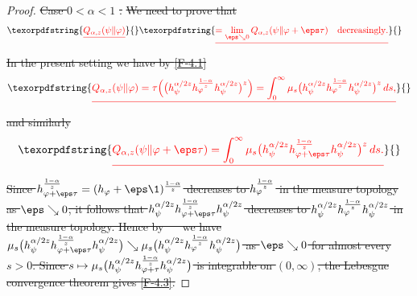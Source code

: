 \documentclass[12pt]{article}
\theoremstyle{definition}
\theoremstyle{remark}
\def\ffi{\varphi}
\providecommand{\DIFdeltex}[1]{{\protect\color{red}\sout{#1}}}                      %
\providecommand{\DIFdelbegin}{} %
\providecommand{\DIFdel}[1]{\texorpdfstring{\DIFdeltex{#1}}{}} %
\begin{document}
\begin{proof} \DIFdelbegin %
\DIFdel{Case $0<\alpha<1$}%
\DIFdel{.}%
\DIFdel{We need to prove that
}\begin{align*}\DIFdel{%
Q_{\alpha,z}(\psi\|\ffi)}&\DIFdel{=\lim_{\eps\searrow0}Q_{\alpha,z}(\psi\|\ffi+\eps\tau)\quad\mbox{decreasingly}.
}\end{align*}%
\DIFdel{In the present setting we have by \eqref{F-4.1}
}\begin{align*}\DIFdel{%
Q_{\alpha,z}(\psi\|\ffi)
=\tau\Bigl(\bigl(h_\psi^{\alpha/2z}h_\ffi^{1-\alpha\over z}h_\psi^{\alpha/2z}\bigr)^z\Bigr)
=\int_0^\infty\mu_s\bigl(h_\psi^{\alpha/2z}h_\ffi^{1-\alpha\over z}h_\psi^{\alpha/2z}\bigr)^z\,ds,
}\end{align*}%
\DIFdel{and similarly
}\[
\DIFdel{Q_{\alpha,z}(\psi\|\ffi+\eps\tau)
=\int_0^\infty\mu_s\bigl(h_\psi^{\alpha/2z}h_{\ffi+\eps\tau}^{1-\alpha\over z}h_\psi^{\alpha/2z}\bigr)^z\,ds.
}\]%
\DIFdel{Since $h_{\ffi+\eps\tau}^{1-\alpha\over z}=(h_\ffi+\eps\1)^{1-\alpha\over z}$ decreases to
$h_\ffi^{1-\alpha\over z}$ in the measure topology as $\eps\searrow0$, 
it follows that
$h_\psi^{\alpha/2z}h_{\ffi+\eps\tau}^{1-\alpha\over z}h_\psi^{\alpha/2z}$ decreases to
$h_\psi^{\alpha/2z}h_\ffi^{1-\alpha\over z}h_\psi^{\alpha/2z}$ in the measure topology. Hence by
\mbox{%
\cite[Lemma 3.4]{fack1986generalized} }\hskip0pt%
we have
$\mu_s\bigl(h_\psi^{\alpha/2z}h_{\ffi+\eps\tau}^{1-\alpha\over z}h_\psi^{\alpha/2z}\bigr)
\searrow\mu_s\bigl(h_\psi^{\alpha/2z}h_\ffi^{1-\alpha\over z}h_\psi^{\alpha/2z}\bigr)$
as $\eps\searrow0$ for almost every $s>0$. Since
$s\mapsto\mu_s\bigl(h_\psi^{\alpha/2z}h_{\ffi+\tau}^{1-\alpha\over z}h_\psi^{\alpha/2z}\bigr)$ is integrable on $(0,\infty)$, the Lebesgue convergence theorem gives \eqref{F-4.3}.
}%


\end{proof}
\end{document}
